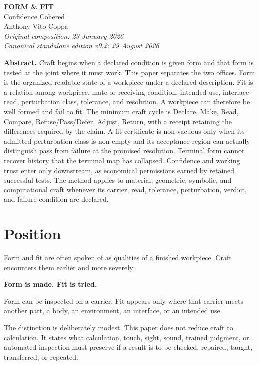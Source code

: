 \documentclass[11pt]{article}
\begin{document}
\begin{center}
{\Large\bfseries FORM \& FIT}\\[3pt]
{\large Confidence Cohered}\\[8pt]
Anthony Vito Coppa\\[2pt]
\textit{Original composition: 23 January 2026}\\
\textit{Canonical standalone edition v0.2: 29 August 2026}
\end{center}

\begin{lawbox}
\textbf{Abstract.}
Craft begins when a declared condition is given form and that form is tested at the joint where it must work. This paper separates the two offices. Form is the organized readable state of a workpiece under a declared description. Fit is a relation among workpiece, mate or receiving condition, intended use, interface read, perturbation class, tolerance, and resolution. A workpiece can therefore be well formed and fail to fit. The minimum craft cycle is Declare, Make, Read, Compare, Refuse/Pass/Defer, Adjust, Return, with a receipt retaining the differences required by the claim. A fit certificate is non-vacuous only when its admitted perturbation class is non-empty and its acceptance region can actually distinguish pass from failure at the promised resolution. Terminal form cannot recover history that the terminal map has collapsed. Confidence and working trust enter only downstream, as economical permissions earned by retained successful tests. The method applies to material, geometric, symbolic, and computational craft whenever its carrier, read, tolerance, perturbation, verdict, and failure condition are declared.
\end{lawbox}

\section{Position}

Form and fit are often spoken of as qualities of a finished workpiece. Craft encounters them earlier and more severely:

\begin{lawbox}
\centering
\textbf{Form is made. Fit is tried.}
\end{lawbox}

Form can be inspected on a carrier. Fit appears only where that carrier meets another part, a body, an environment, an interface, or an intended use.

The distinction is deliberately modest. This paper does not reduce craft to calculation. It states what calculation, touch, sight, sound, trained judgment, or automated inspection must preserve if a result is to be checked, repaired, taught, transferred, or repeated.
\end{document}
